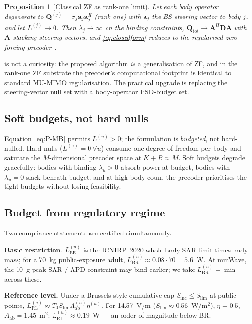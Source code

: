 \documentclass[journal,twocolumn,10pt]{IEEEtran}
\newtheorem{proposition}[theorem]{Proposition}
\theoremstyle{definition}
\newcommand{\avec}{\mathbf{a}}
\newcommand{\Sinc}{S_{\mathrm{inc}}}
\newcommand{\Q}{\mathbf{Q}}
\newcommand{\Aab}{A_{\mathrm{ab}}}
\begin{document}
\begin{proposition}[Classical ZF as rank-one limit]\label{prop:ZFlimit}
Let each body operator degenerate to
$\Q^{(j)}=\sigma_j\avec_j\avec_j^H$ (rank one) with $\avec_j$
the BS steering vector to body $j$, and let $L^{(j)}\to 0$.
Then $\lambda_j\to\infty$ on the binding constraints,
$\Q_{\mathrm{tot}}\to\mathbf{A}^H\mathbf{D}\mathbf{A}$
with $\mathbf{A}$ stacking steering vectors, and
\cref{eq:closedform} reduces to the regularised zero-forcing
precoder~\cite{PeelHochwald2005}.
\end{proposition}

 is not a curiosity: the proposed algorithm
\emph{is} a generalisation of ZF, and in the rank-one ZF
substrate the precoder's computational footprint is identical
to standard MU-MIMO regularisation. The practical upgrade is
replacing the steering-vector null set with a
body-operator PSD-budget set.

\subsection{Soft budgets, not hard nulls}\label{sec:softbudget}

Equation~\eqref{eq:P-MB} permits $L^{(u)}>0$; the formulation
is \emph{budgeted}, not hard-nulled. Hard nulls
($L^{(u)}=0~\forall u$) consume one degree of freedom per body
and saturate the $M$-dimensional precoder space at $K+B\approx M$.
Soft budgets degrade gracefully: bodies with binding
$\lambda_u>0$ absorb power at budget, bodies with $\lambda_u=0$
slack beneath budget, and at high body count the precoder
prioritises the tight budgets without losing feasibility.

\subsection{Budget from regulatory regime}\label{sec:budget}

Two compliance statements are certified simultaneously.

\textbf{Basic restriction.}
$L^{(u)}_{\mathrm{BR}}$ is the ICNIRP~2020 whole-body SAR limit
times body mass; for a 70~kg public-exposure adult,
$L^{(u)}_{\mathrm{BR}}\approx 0.08\cdot 70=5.6$~W. At mmWave, the
10~g peak-SAR / APD constraint may bind earlier; we take
$L^{(u)}_{\mathrm{BR}}=\min$ across these.

\textbf{Reference level.} Under a Brussels-style cumulative
cap $\Sinc\le S_{\mathrm{lim}}$ at public points,
$L^{(u)}_{\mathrm{RL}}\approx T_0 S_{\mathrm{lim}}\Aab^{(u)}\bar\eta^{(u)}$.
For 14.57~V/m ($S_{\mathrm{lim}}\approx 0.56$~W/m$^2$),
$\bar\eta=0.5$, $\Aab=1.45$~m$^2$:
$L^{(u)}_{\mathrm{RL}}\approx 0.19$~W --- an order of magnitude
below BR.
\end{document}
